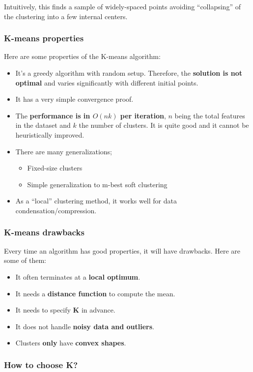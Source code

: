 Intuitively, this finds a sample of widely-spaced points avoiding ``collapsing'' of the clustering into a few internal centers.

\subsubsection{K-means properties}

Here are some properties of the K-means algorithm:
\begin{itemize}
 \item It's a greedy algorithm with random setup. Therefore, the {\bf solution is not optimal} and varies significantly with different initial points.
 \item It has a very simple convergence proof.
 \item The {\bf performance is in $O(nk)$ per iteration}, $n$ being the total features in the dataset and $k$ the number of clusters. It is quite good and it cannot be heuristically improved.
 \item There are many generalizations;
 \begin{itemize}
  \item Fixed-size clusters
  \item Simple generalization to m-best soft clustering
 \end{itemize}
 \item As a ``local'' clustering method, it works well for data condensation/compression.
\end{itemize}

\subsubsection{K-means drawbacks}

Every time an algorithm has good properties, it will have drawbacks. Here are some of them:
\begin{itemize}
 \item It often terminates at a {\bf local optimum}.
 \item It needs a {\bf distance function} to compute the mean.
 \item It needs to specify {\bf K} in advance.
 \item It does not handle {\bf noisy data and outliers}.
 \item Clusters {\bf only} have {\bf convex shapes}.
\end{itemize}

\subsubsection{How to choose K?}

